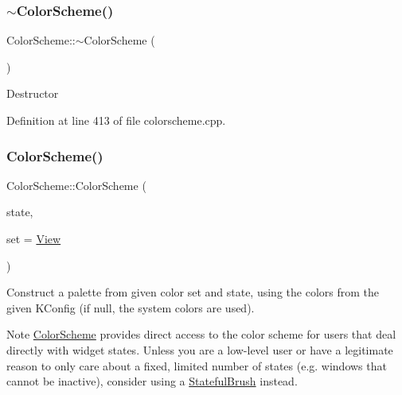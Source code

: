 \mbox{\label{class_color_scheme_ad427e52b00c856170e2ae0c8b70582d0}} 
\subsubsection{\texorpdfstring{$\sim$\+Color\+Scheme()}{~ColorScheme()}}
{\footnotesize\ttfamily Color\+Scheme\+::$\sim$\+Color\+Scheme (\begin{DoxyParamCaption}{ }\end{DoxyParamCaption})\hspace{0.3cm}{\ttfamily [virtual]}}

Destructor 

Definition at line 413 of file colorscheme.\+cpp.

\mbox{\label{class_color_scheme_a754889d914c61f8fdd29388174367568}} 
\subsubsection{\texorpdfstring{Color\+Scheme()}{ColorScheme()}\hspace{0.1cm}{\footnotesize\ttfamily [2/2]}}
{\footnotesize\ttfamily Color\+Scheme\+::\+Color\+Scheme (\begin{DoxyParamCaption}\item[{Q\+Palette\+::\+Color\+Group}]{state,  }\item[{\hyperlink{class_color_scheme_a56ea451e86dffa1822ed087902844e05}{Color\+Set}}]{set = {\ttfamily \hyperlink{class_color_scheme_a56ea451e86dffa1822ed087902844e05a45150fc89ebfd98918cb57ecae48f7c8}{View}} }\end{DoxyParamCaption})\hspace{0.3cm}{\ttfamily [explicit]}}

Construct a palette from given color set and state, using the colors from the given K\+Config (if null, the system colors are used).

\begin{DoxyNote}{Note}
\hyperlink{class_color_scheme}{Color\+Scheme} provides direct access to the color scheme for users that deal directly with widget states. Unless you are a low-\/level user or have a legitimate reason to only care about a fixed, limited number of states (e.\+g. windows that cannot be inactive), consider using a \hyperlink{class_stateful_brush}{Stateful\+Brush} instead. 
\end{DoxyNote}


